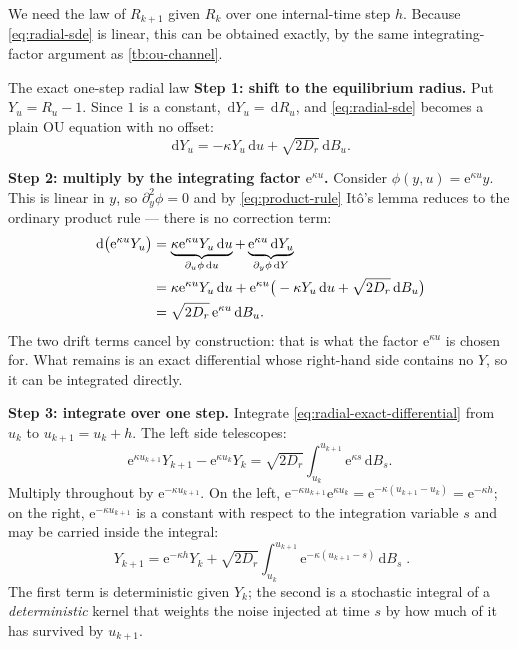 \documentclass[11pt,a4paper]{article}
\newcommand{\dd}{\,\mathrm d}
\newcommand{\e}{\mathrm e}
\newcounter{toolbox}
\begin{document}
We need the law of $R_{k+1}$ given $R_k$ over one internal-time step $h$. Because
\eqref{eq:radial-sde} is linear, this can be obtained exactly, by the same integrating-factor
argument as \cref{tb:ou-channel}.

\begin{toolbox}{The exact one-step radial law}\label{tb:radial}
\textbf{Step 1: shift to the equilibrium radius.} Put $Y_u=R_u-1$. Since $1$ is a constant,
$\dd Y_u=\dd R_u$, and \eqref{eq:radial-sde} becomes a plain OU equation with no offset:
\begin{equation}
 \dd Y_u=-\kappa Y_u\dd u+\sqrt{2D_r}\dd B_u .
 \label{eq:shifted-radial}
\end{equation}

\textbf{Step 2: multiply by the integrating factor $\e^{\kappa u}$.} Consider
$\phi(y,u)=\e^{\kappa u}y$. This is linear in $y$, so $\partial_y^2\phi=0$ and by
\eqref{eq:product-rule} It\^o's lemma reduces to the ordinary product rule --- there is no
correction term:
\begin{align}
 \dd\big(\e^{\kappa u}Y_u\big)
 &=\underbrace{\kappa\e^{\kappa u}Y_u\dd u}_{\partial_u\phi\dd u}
  +\underbrace{\e^{\kappa u}\dd Y_u}_{\partial_y\phi\dd Y}
 \label{eq:radial-product}\\
 &=\kappa\e^{\kappa u}Y_u\dd u
  +\e^{\kappa u}\big(-\kappa Y_u\dd u+\sqrt{2D_r}\dd B_u\big)
 \notag\\
 &=\sqrt{2D_r}\,\e^{\kappa u}\dd B_u .
 \label{eq:radial-exact-differential}
\end{align}
The two drift terms cancel by construction: that is what the factor $\e^{\kappa u}$ is chosen
for. What remains is an exact differential whose right-hand side contains no $Y$, so it can be
integrated directly.

\textbf{Step 3: integrate over one step.} Integrate \eqref{eq:radial-exact-differential} from
$u_k$ to $u_{k+1}=u_k+h$. The left side telescopes:
\begin{equation}
 \e^{\kappa u_{k+1}}Y_{k+1}-\e^{\kappa u_k}Y_k
 =\sqrt{2D_r}\int_{u_k}^{u_{k+1}}\e^{\kappa s}\dd B_s .
\end{equation}
Multiply throughout by $\e^{-\kappa u_{k+1}}$. On the left,
$\e^{-\kappa u_{k+1}}\e^{\kappa u_k}=\e^{-\kappa(u_{k+1}-u_k)}=\e^{-\kappa h}$; on the right,
$\e^{-\kappa u_{k+1}}$ is a constant with respect to the integration variable $s$ and may be
carried inside the integral:
\begin{equation}
 \boxed{\;Y_{k+1}=\e^{-\kappa h}Y_k
 +\sqrt{2D_r}\int_{u_k}^{u_{k+1}}\e^{-\kappa(u_{k+1}-s)}\dd B_s\;.}
 \label{eq:radial-solution}
\end{equation}
The first term is deterministic given $Y_k$; the second is a stochastic integral of a
\emph{deterministic} kernel that weights the noise injected at time $s$ by how much of it has
survived by $u_{k+1}$.


\end{toolbox}
\end{document}
